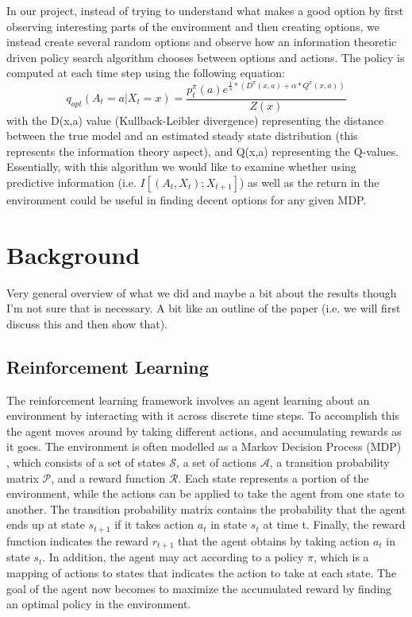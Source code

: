 \documentclass{acm_proc_article-sp}
\begin{document}
In our project, instead of trying to understand what makes a good option by first observing interesting parts of the environment and then creating options, we instead create several random options and observe how an information theoretic driven policy search algorithm \cite{still} chooses between options and actions. The policy is computed at each time step using the following equation: $$q_{opt}(A_t = a| X_t = x) = \frac{p^\pi_t(a)e^{\frac{1}{\lambda}*(D^\pi(x,a) + \alpha*Q^\pi(x,a))}}{Z(x)}$$ with the D(x,a) value (Kullback-Leibler divergence) representing the distance between the true model and an estimated steady state distribution (this represents the information theory aspect), and Q(x,a) representing the Q-values. Essentially, with this algorithm we would like to examine whether using predictive information (i.e. $I[(A_t,X_t); X_{t+1}]$) as well as the return in the environment could be useful in finding decent options for any given MDP.

\section{Background} %

Very general overview of what we did and maybe a bit about the results though I'm not sure that is necessary. A bit like an outline of the paper (i.e. we will first discuss this and then show that).

\subsection{Reinforcement Learning}


The reinforcement learning framework involves an agent learning about an environment by interacting with it across discrete time steps. To accomplish this the agent moves around by taking different actions, and accumulating rewards as it goes.
	 The environment is often modelled as a Markov Decision Process (MDP) \cite{Puterman}, which consists of a set of states $\mathcal{S}$, a set of actions $\mathcal{A}$, a transition probability matrix $\mathcal{P}$, and a reward function $\mathcal{R}$. Each state represents a portion of the environment, while the actions can be applied to take the agent from one state to another. 
	 The transition probability matrix contains the probability that the agent ends up at state $s_{t+1}$ if it takes action $a_t$ in state $s_t$ at time t. Finally, the reward function indicates the reward $r_{t+1}$ that the agent obtains by taking action $a_t$ in state $s_t$. In addition, the agent may act according to a policy $\pi$, which is a mapping of actions to states that indicates the action to take at each state. The goal of the agent now becomes to maximize the accumulated reward by finding an optimal policy in the environment.  
	 
\end{document}
